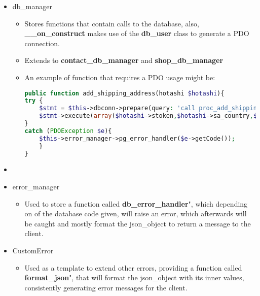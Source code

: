 \begin{flushleft}
\begin{itemize}
        \item db\_manager
        \begin{itemize}
            \item Stores functions that contain calls to the database, also, \textbf{\_\_on\_construct} makes use of the \textbf{db\_user}  class to generate a PDO connection.
            \item Extends to \textbf{contact\_db\_manager} and \textbf{shop\_db\_manager}
            \item \begin{flushleft}
                An example of function that requires a PDO usage might be:
                \begin{lstlisting}[language=php,label={lst:php_pdo_query_example}]
public function add_shipping_address(hotashi $hotashi){
try {
    $stmt = $this->dbconn->prepare(query: 'call proc_add_shipping_address_from_stoken(?,?,?,?,?,?,?);');
    $stmt->execute(array($hotashi->stoken,$hotashi->sa_country,$hotashi->sa_city,$hotashi->sa_pcode,$hotashi->sa_add1,$hotashi->sa_add2,$hotashi->sa_add3));
}
catch (PDOException $e){
    $this->error_manager->pg_error_handler($e->getCode());
    }
}
                \end{lstlisting}
            \end{flushleft}
        \end{itemize}
        \item
    \end{itemize}
    \begin{itemize}
        \item error\_manager
        \begin{itemize}
            \item Used to store a function called \"\textbf{db\_error\_handler}", which depending on of the database
            code given, will raise an error, which afterwards will be caught and mostly format the json\_object to
            return a message to the client.
        \end{itemize}
    \end{itemize}
    \begin{itemize}
        \item CustomError
        \begin{itemize}
            \item Used as a template to extend other errors, providing a function called \"\textbf{format\_json}", that
            will format the json\_object with its inner values, consistently generating error messages for the client.

\end{itemize}
\end{itemize}
\end{flushleft}
